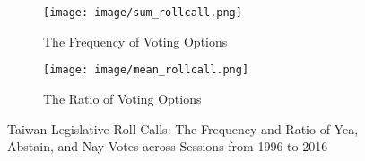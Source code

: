 


\begin{figure}[!ht]
    \centering
    
    \begin{subfigure}[b]{0.97\textwidth}
    \caption{The Frequency of Voting Options}
    \centering\texttt{[image: image/sum\_rollcall.png]}
    \label{fig:sum_roll_call}    
    \end{subfigure}    
    
    \begin{subfigure}[b]{0.97\textwidth}
    \caption{The Ratio of Voting Options }
    \label{fig:mean_roll_call}
    \centering\texttt{[image: image/mean\_rollcall.png]}
    \end{subfigure}
    
    \caption{Taiwan Legislative Roll Calls: The Frequency and Ratio of Yea, Abstain, and Nay Votes across Sessions from 1996 to 2016}
    \label{fig:vote-distribution}    
\end{figure}
